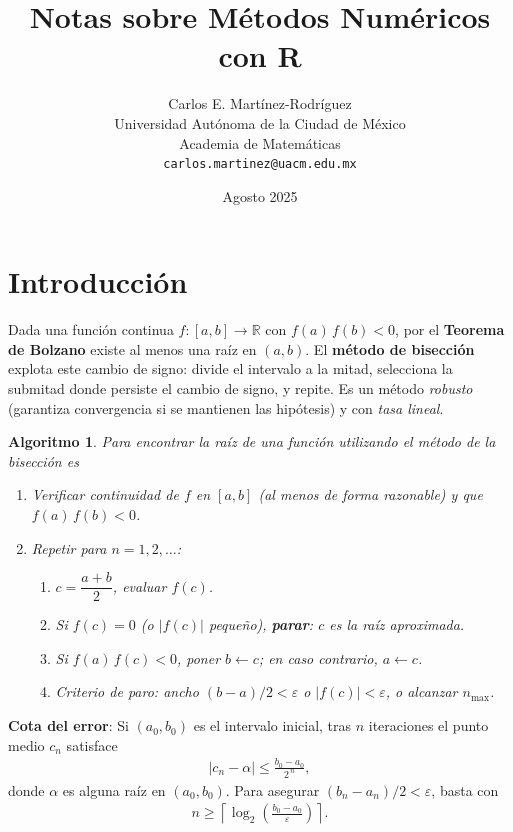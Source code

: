 \documentclass[12pt]{article}
\title{Notas sobre Métodos Numéricos con R}
\author{
Carlos E. Martínez-Rodríguez \\
Universidad Autónoma de la Ciudad de México \\
Academia de Matemáticas \\
\texttt{carlos.martinez@uacm.edu.mx}
}
\date{Agosto 2025}
\date{}
\newtheorem{Algthm}{Algoritmo}
\begin{document}
\maketitle
\tableofcontents

\section{Introducci\'on}

Dada una función continua $f:[a,b]\to\mathbb{R}$ con $f(a)\,f(b)<0$, por el \textbf{Teorema de Bolzano} existe al menos una raíz en $(a,b)$. 
El \textbf{método de bisección} explota este cambio de signo: divide el intervalo a la mitad, selecciona la submitad donde persiste el cambio de signo, y repite. 
Es un método \emph{robusto} (garantiza convergencia si se mantienen las hipótesis) y con \emph{tasa lineal}.

\begin{Algthm} Para encontrar la ra\'iz de una funci\'on utilizando el m\'etodo de la bisecci\'on es
\begin{enumerate}
  \item Verificar continuidad de $f$ en $[a,b]$ (al menos de forma razonable) y que $f(a)\,f(b)<0$.
  \item Repetir para $n=1,2,\dots$:
  \begin{enumerate}
    \item $c=\dfrac{a+b}{2}$, evaluar $f(c)$.
    \item Si $f(c)=0$ (o $|f(c)|$ pequeño), \textbf{parar}: $c$ es la raíz aproximada.
    \item Si $f(a)\,f(c)<0$, poner $b\leftarrow c$; en caso contrario, $a\leftarrow c$.
    \item Criterio de paro: \textit{ancho} $(b-a)/2 < \varepsilon$ o $|f(c)|<\varepsilon$, o alcanzar $n_{\max}$.
  \end{enumerate}
\end{enumerate}
\end{Algthm}

\textbf{Cota del error}: Si $(a_0,b_0)$ es el intervalo inicial, tras $n$ iteraciones el punto medio $c_n$ satisface
\begin{eqnarray}
  |c_n - \alpha| \leq \frac{b_0-a_0}{2^{\,n}},
\end{eqnarray}
donde $\alpha$ es alguna raíz en $(a_0,b_0)$. 
Para asegurar $(b_n-a_n)/2 < \varepsilon$, basta con
\begin{eqnarray}
  n \geq \left\lceil \log_2\!\left(\frac{b_0-a_0}{\varepsilon}\right) \right\rceil.
\end{eqnarray}
\end{document}
